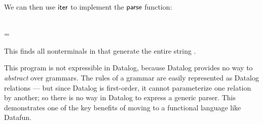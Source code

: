 \noindent
We can then use $\text{\sffamily iter}$ to implement the $\text{\sffamily parse}$ function:

\begin{code}
   \isa \iso \tstring \to \iso \tgrammar \to \tset{\tsymbol}\\
   \> \> = \\
  \quad {}
\end{code}

\noindent
This finds all nonterminals in  that generate the entire string
. 


This program is not expressible in Datalog, because Datalog provides no way to
\emph{abstract} over grammars. The rules of a grammar are easily represented as
Datalog relations --- but since Datalog is first-order, it cannot parameterize
one relation by another; so there is no way in Datalog to express a generic
parser. This demonstrates one of the key benefits of moving to a functional
language like Datafun. %


